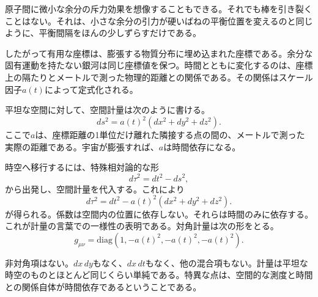 原子間に微小な余分の斥力効果を想像することもできる。それでも棒を引き裂くことはない。それは、小さな余分の引力が硬いばねの平衡位置を変えるのと同じように、平衡間隔をほんの少しずらすだけである。

\begin{classroomqa}
\end{classroomqa}

したがって有用な座標は、膨張する物質分布に埋め込まれた座標である。余分な固有運動を持たない銀河は同じ座標値を保つ。時間とともに変化するのは、座標上の隔たりとメートルで測った物理的距離との関係である。その関係はスケール因子\(a(t)\)によって定式化される。

平坦な空間に対して、空間計量は次のように書ける。
\begin{equation}
ds^2 = a(t)^2\left(dx^2+dy^2+dz^2\right).
\end{equation}
ここで\(a\)は、座標距離の1単位だけ離れた隣接する点の間の、メートルで測った実際の距離である。宇宙が膨張すれば、\(a\)は時間依存になる。

時空へ移行するには、特殊相対論的な形
\begin{equation}
d\tau^2 = dt^2 - ds^2,
\end{equation}
から出発し、空間計量を代入する。これにより
\begin{equation}
d\tau^2 = dt^2 - a(t)^2\left(dx^2+dy^2+dz^2\right).
\end{equation}
が得られる。係数は空間内の位置に依存しない。それらは時間のみに依存する。これが計量の言葉での一様性の表明である。対角計量は次の形をとる。
\begin{equation}
g_{\mu\nu}=\mathrm{diag}\!\left(1,-a(t)^2,-a(t)^2,-a(t)^2\right).
\end{equation}

非対角項はない。\(dx\,dy\)もなく、\(dx\,dt\)もなく、他の混合項もない。計量は平坦な時空のものとほとんど同じくらい単純である。特異な点は、空間的な測度と時間との関係自体が時間依存であるということである。

